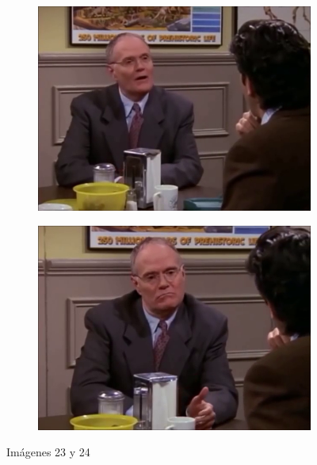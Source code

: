 \documentclass[12pt,a4paper]{article}
\begin{document}
\begin{figure}[H]
  \centering
    \begin{subfigure}{0.45\textwidth}
      \includegraphics[scale=0.33]{./Imagenes/23.png}
    \end{subfigure}
    \begin{subfigure}{0.45\textwidth}
      \includegraphics[scale=0.33]{./Imagenes/24.png}
    \end{subfigure}
    \caption{Imágenes 23 y 24}
\end{figure}
\end{document}
